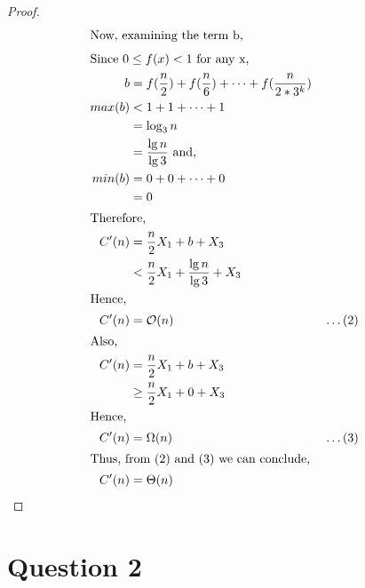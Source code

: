 \documentclass{article}
\begin{document}
\begin{proof}
\begin{align*}
\intertext{Now, examining the term b,}
\intertext{Since $0\leq f(x) < 1$ for any x,}
b & = f(\frac{n}{2}) + f(\frac{n}{6}) + \dots + f(\frac{n}{2*3^k}) \\
max(b) & < 1 + 1 + \dots + 1 \\
& = \log_3n \\
& = \frac{\lg n}{\lg 3} \text{ and,} \\
min(b) & = 0 + 0 + \dots + 0 \\
& = 0\\
\intertext{Therefore, }
C'(n) & = \frac{n}{2}X_1 + b + X_3 \\
& < \frac{n}{2}X_1 + \frac{\lg n}{\lg 3} + X_3 \\
\intertext {Hence,}
C'(n) & = \mathcal{O}(n) && \dots (2) \\ 
\intertext{Also, }
C'(n) & = \frac{n}{2}X_1 + b + X_3 \\
& \geq \frac{n}{2}X_1 + 0 + X_3 \\
\intertext {Hence,}
C'(n) & = \Omega(n) && \dots (3) \\
\intertext {Thus, from (2) and (3) we can conclude,}
C'(n) & = \Theta(n)
\end{align*}

\end{proof}


\newpage
\section{Question 2}
\end{document}
